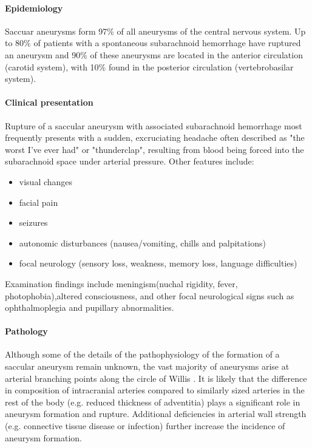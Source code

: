 \paragraph{Epidemiology}

Saccuar aneurysms form 97\% of all aneurysms of the central nervous system. Up to 80\% of patients with a spontaneous subarachnoid hemorrhage have ruptured an aneurysm and 90\% of these aneurysms are located in the anterior circulation (carotid system), with 10\% found in the posterior circulation (vertebrobasilar system).

\paragraph{Clinical presentation}

Rupture of a saccular aneurysm with associated subarachnoid hemorrhage most frequently presents with a sudden, excruciating headache often described as "the worst I've ever had" or "thunderclap", resulting from blood being forced into the subarachnoid space under arterial pressure. Other features include:

\begin{itemize}
	\item
	visual changes
	\item
	facial pain
	\item
	seizures
	\item
	autonomic disturbances (nausea/vomiting, chills and palpitations)
	\item
	focal neurology (sensory loss, weakness, memory loss, language difficulties)
\end{itemize}

Examination findings include meningism(nuchal rigidity, fever, photophobia),altered consciousness, and other focal neurological signs such as ophthalmoplegia and pupillary abnormalities.

\paragraph{Pathology}

Although some of the details of the pathophysiology of the formation of a saccular aneurysm remain unknown, the vast majority of aneurysms arise at arterial branching points along the circle of Willis . It is likely that the difference in composition of intracranial arteries compared to similarly sized arteries in the rest of the body (e.g. reduced thickness of adventitia) plays a significant role in aneurysm formation and rupture. Additional deficiencies in arterial wall strength (e.g. connective tissue disease or infection) further increase the incidence of aneurysm formation.

